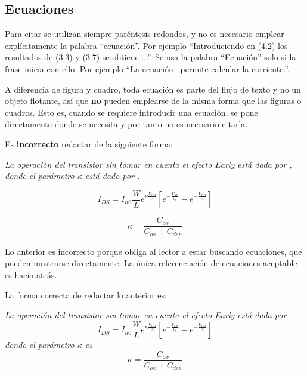 \subsection{Ecuaciones}

Para citar  se utilizan siempre paréntesis redondos, y
no es necesario emplear explícitamente la palabra ``ecuación''. Por
ejemplo ``Introduciendo en (4.2) los resultados de (3.3) y (3.7) se
obtiene ...''.  Se usa la palabra ``Ecuación'' solo si la frase inicia
con ello.  Por ejemplo ``La ecuación~ permite calcular la
corriente.''.

A diferencia de figura y cuadro, toda ecuación es parte del flujo de
texto y no un objeto flotante, así que \textbf{no} pueden emplearse de
la misma forma que las figuras o cuadros.  Esto es, cuando se requiere
introducir una ecuación, se pone directamente donde se necesita y por
tanto no es necesario citarla.

Es \textbf{incorrecto} redactar de la siguiente forma: 

\textsl{La operación del transistor sin tomar en cuenta el efecto Early está
  dada por , donde el parámetro $\kappa$ está dado por
  .}

\begin{equation} \label{eq:ej1}
  I_{DS}
  =
  I_{n0} \frac{W}{L}e^{\kappa \frac{V_{GB}}{v_t}}
  \left[
    e^{-\frac{V_{SB}}{v_t}}
    -
    e^{-\frac{V_{DB}}{v_t}}
  \right]
\end{equation}

\begin{equation} \label{eq:ej2}
  \kappa = \frac{C_{ox}}{C_{ox}+C_{dep}}
\end{equation}

Lo anterior es incorrecto porque obliga al lector a estar buscando
ecuaciones, que pueden mostrarse directamente.  La única
referenciación de ecuaciones aceptable es hacia atrás.

La forma correcta de redactar lo anterior es: 

\textsl{La operación del transistor sin tomar en cuenta el efecto Early está
  dada por}
\begin{equation} \label{eq:ej3}
  I_{DS}
  =
  I_{n0} \frac{W}{L}e^{\kappa \frac{V_{GB}}{v_t}}
  \left[
    e^{-\frac{V_{SB}}{v_t}}
    -
    e^{-\frac{V_{DB}}{v_t}}
  \right]
\end{equation}
\textsl{donde el parámetro $\kappa$ es}
\begin{equation} \label{eq:ej4}
  \kappa = \frac{C_{ox}}{C_{ox}+C_{dep}}
\end{equation}

